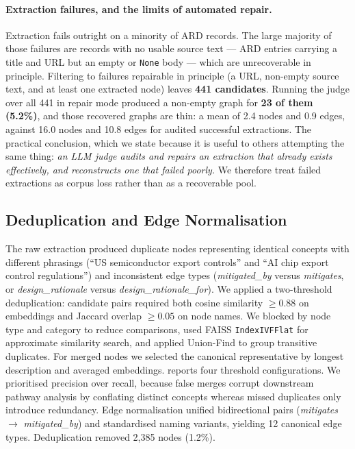 \documentclass[10pt,twocolumn,letterpaper]{article}
\begin{document}
\paragraph{Extraction failures, and the limits of automated repair.}
Extraction fails outright on a minority of ARD records. The large majority of
those failures are records with no usable source text --- ARD entries carrying a
title and URL but an empty or \texttt{None} body --- which are unrecoverable in
principle. Filtering to failures repairable in principle (a URL, non-empty source
text, and at least one extracted node) leaves \textbf{441 candidates}. Running
the judge over all 441 in repair mode produced a non-empty graph for \textbf{23
of them (5.2\%)}, and those recovered graphs are thin: a mean of 2.4 nodes and
0.9 edges, against 16.0 nodes and 10.8 edges for audited successful extractions.
The practical conclusion, which we state because it is useful to others
attempting the same thing: \emph{an LLM judge audits and repairs an extraction
that already exists effectively, and reconstructs one that failed poorly.} We
therefore treat failed extractions as corpus loss rather than as a recoverable
pool.

\subsection{Deduplication and Edge Normalisation}

The raw extraction produced duplicate nodes representing identical concepts with
different phrasings (``US semiconductor export controls'' and ``AI chip export
control regulations'') and inconsistent edge types (\textit{mitigated\_by} versus
\textit{mitigates}, or \textit{design\_rationale} versus
\textit{design\_rationale\_for}). We applied a two-threshold deduplication:
candidate pairs required both cosine similarity $\geq 0.88$ on embeddings and
Jaccard overlap $\geq 0.05$ on node names. We blocked by node type and category
to reduce comparisons, used FAISS \texttt{IndexIVFFlat} for approximate
similarity search, and applied Union-Find to group transitive duplicates. For
merged nodes we selected the canonical representative by longest description and
averaged embeddings.  reports four threshold configurations. We
prioritised precision over recall, because false merges corrupt downstream
pathway analysis by conflating distinct concepts whereas missed duplicates only
introduce redundancy. Edge normalisation unified bidirectional pairs
(\textit{mitigates} $\rightarrow$ \textit{mitigated\_by}) and standardised naming
variants, yielding 12 canonical edge types. Deduplication removed 2{,}385 nodes
(1.2\%).
\end{document}
